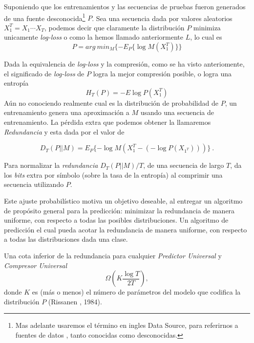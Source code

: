Suponiendo que los entrenamientos y las secuencias de pruebas fueron generados de una fuente desconocida\footnote{Mas adelante usaremos el término en ingles Data Source, para referirnos a fuentes de datos , tanto conocidas como desconocidas.} $P$. Sea una secuencia dada por valores aleatorios $X_{1}^{T} = X_{1} \cdots X_{T} $, podemos decir que claramente la distribución $P$ minimiza unicamente \emph{log-loss} o como la hemos llamado anteriormente $L$, lo cual es \begin{equation}
P = arg\ min_{M} \{ - E_{P} \{\log M( X_{1}^{T} )\}   \}
\end{equation}


Dada la equivalencia de \emph{log-loss} y la compresión, como se ha visto anteriomente, el significado de \emph{log-loss} de $P$ logra la mejor compresión posible, o logra una entropía 
\begin{equation}
	H_{T}(P) = - E \log P( X_{1}^{T} ) 
\end{equation}
Aún no conociendo realmente cual es la distribución de probabilidad de $P$, un entrenamiento genera una aproximación a $M$ usando una secuencia de entrenamiento. La pérdida extra que podemos obtener la llamaremos \emph{Redundancia} y esta dada por el valor de

\begin{equation}
D_{T} ( P || M ) = E_{P} \{ - \log M(X_{1}^{T} - (- \log P(X_{1^{T}})   )  )       \} \ .
\end{equation}
 

Para normalizar la \emph{redundancia} $D_{T} ( P || M ) / T $, de una secuencia de largo $T$, da los  \emph{bits} extra por símbolo (sobre la tasa de la entropía) al comprimir una secuencia utilizando $P$.  

Este ajuste probabilístico motiva un objetivo deseable, al entregar un algoritmo de propósito general para la predicción: minimizar la redundancia de manera uniforme, con respecto a todas las posibles distribuciones. Un algoritmo de predicción el cual pueda acotar la redundancia de manera uniforme, con respecto a todas las distribuciones dada una clase.

Una cota inferior de la redundancia para cualquier \emph{Predictor Universal} y \emph{Compresor Universal} \begin{equation}
\Omega \left(  K \dfrac{\log T}{2 T } \right),
\end{equation} donde $K$ es (más o menos) el número de parámetros del modelo que codifica la distribución $P$ (Rissanen \cite{Rissanen1984}, 1984).






